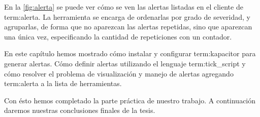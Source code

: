 En la \autoref{fig:alerta} se puede ver cómo se ven las alertas listadas en el
cliente de \gls{term:alerta}. La herramienta se encarga de ordenarlas por grado
de severidad, y agruparlas, de forma que no aparezcan las alertas repetidas,
sino que aparezcan una única vez, especificando la cantidad de repeticiones con
un contador.

En este capítulo hemos mostrado cómo instalar y configurar \gls{term:kapacitor}
para generar alertas. Cómo definir alertas utilizando el lenguaje
\gls{term:tick_script} y cómo resolver el problema de visualización y manejo de
alertas agregando \gls{term:alerta} a la lista de herramientas.

Con ésto hemos completado la parte práctica de nuestro trabajo. A continuación
daremos nuestras conclusiones finales de la tesis.
